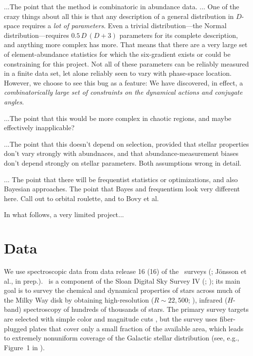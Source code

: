 \documentclass[modern]{aastex63}
\newcommand{\dr}[1]{\acronym{DR}#1}
\newcommand{\apogee}{\acronym{APOGEE}}
\newcommand{\sdssiv}{\acronym{SDSS-IV}}
\begin{document}
...The point that the method is combinatoric in abundance data.
...
One of the crazy things about all this is that any description of a general distribution in $D$-space
requires a \emph{lot of parameters}.
Even a trivial distribution---the Normal distribution---requires $0.5\,D\,(D+3)$ parameters for its
complete description, and anything more complex has more.
That means that there are a very large set of element-abundance statistics for which the
six-gradient exists or could be constraining for this project.
Not all of these parameters can be reliably measured in a finite data set,
let alone reliably seen to vary with phase-space location.
However, we choose to see this bug as a feature:
We have discovered, in effect, a \emph{combinatorically large set of constraints on the
dynamical actions and conjugate angles}.

...The point that this would be more complex in chaotic regions, and
maybe effectively inapplicable?

...The point that this doesn't depend on selection, provided that
stellar properties don't vary strongly with abundnaces, and that
abundance-measurement biases don't depend strongly on stellar
parameters. Both assumptions wrong in detail.

... The point that there will be frequentist statistics or
optimizations, and also Bayesian approaches.  The point that Bayes and
frequentism look very different here. Call out to orbital roulette,
and to Bovy et al.

In what follows, a very limited project...

\section{Data}

We use spectroscopic data from data release 16 (\dr{16}) of the \apogee\ surveys
(\citealt{Majewski:2017, DR16}; J\"onsson et al., in prep.).
\apogee\ is a component of the Sloan Digital Sky Survey IV (\sdssiv;
\citealt{Gunn:2006, Blanton:2017}); its main goal is to survey the chemical
and dynamical properties of stars across much of the Milky Way disk by obtaining
high-resolution ($R \sim 22,500$; \citealt{Wilson:2019}), infrared ($H$-band)
spectroscopy of hundreds of thousands of stars.
The primary survey targets are selected with simple color and magnitude cuts
\citep{Zasowski:2013, Zasowski:2017}, but the survey uses fiber-plugged plates
that cover only a small fraction of the available area, which leads to extremely
nonuniform coverage of the Galactic stellar distribution (see, e.g., Figure~1 in
\citealt{DR16}).
\end{document}
